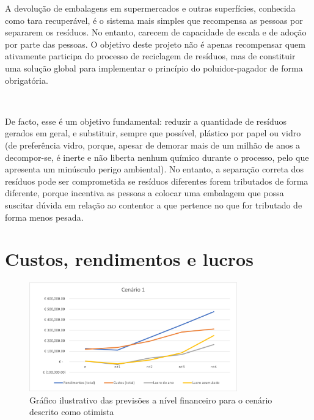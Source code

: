 \documentclass[11pt, a4paper, oneside]{book}
\begin{document}
\begin{appendices}
A devolução de embalagens em supermercados e outras superfícies, conhecida como tara recuperável, é o sistema mais simples que recompensa as pessoas por separarem os resíduos. No entanto, carecem de capacidade de escala e de adoção por parte das pessoas. O objetivo deste projeto não é apenas recompensar quem ativamente participa do processo de reciclagem de resíduos, mas de constituir uma solução global para implementar o princípio do poluidor-pagador de forma obrigatória.

~

\noindent{}

De facto, esse é um objetivo fundamental: reduzir a quantidade de resíduos gerados em geral, e substituir, sempre que possível, plástico por papel ou vidro (de preferência vidro, porque, apesar de demorar mais de um milhão de anos a decompor-se, é inerte e não liberta nenhum químico durante o processo, pelo que apresenta um minúsculo perigo ambiental). No entanto, a separação correta dos resíduos pode ser comprometida se resíduos diferentes forem tributados de forma diferente, porque incentiva as pessoas a colocar uma embalagem que possa suscitar dúvida em relação ao contentor a que pertence no que for tributado de forma menos pesada.

\chapter{Custos, rendimentos e lucros}
\label{ch:anexo-custos}

\begin{figure}[ht]
  \centering
  \includegraphics[width = 90mm]{img/graphs/ppin_graph_1.png}
  \caption{Gráfico ilustrativo das previsões a nível financeiro para o cenário descrito como otimista}
\end{figure}

\vspace{-0.5em}


\end{appendices}
\end{document}
